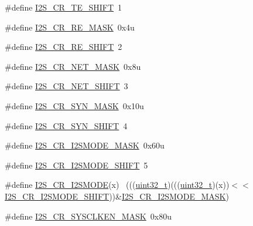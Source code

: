\begin{DoxyCompactItemize}
\item 
\#define \hyperlink{group___i2_s___register___masks_gaa6805ac79a77891ff728129eb07f7685}{I2\+S\+\_\+\+C\+R\+\_\+\+T\+E\+\_\+\+S\+H\+I\+FT}~1
\item 
\#define \hyperlink{group___i2_s___register___masks_ga1fd940f6ddd4eb3aae670de645733e25}{I2\+S\+\_\+\+C\+R\+\_\+\+R\+E\+\_\+\+M\+A\+SK}~0x4u
\item 
\#define \hyperlink{group___i2_s___register___masks_ga2fea363592138a43a8f052f153b8cc5a}{I2\+S\+\_\+\+C\+R\+\_\+\+R\+E\+\_\+\+S\+H\+I\+FT}~2
\item 
\#define \hyperlink{group___i2_s___register___masks_gaf997161eecadb9feb698711bd9ef7d8c}{I2\+S\+\_\+\+C\+R\+\_\+\+N\+E\+T\+\_\+\+M\+A\+SK}~0x8u
\item 
\#define \hyperlink{group___i2_s___register___masks_ga1a66917a059c27bc215cb87ef71bea2f}{I2\+S\+\_\+\+C\+R\+\_\+\+N\+E\+T\+\_\+\+S\+H\+I\+FT}~3
\item 
\#define \hyperlink{group___i2_s___register___masks_ga03f89669e54c6214cafc97d43648298b}{I2\+S\+\_\+\+C\+R\+\_\+\+S\+Y\+N\+\_\+\+M\+A\+SK}~0x10u
\item 
\#define \hyperlink{group___i2_s___register___masks_ga5212bf1a15d3760d888489d7f3de1921}{I2\+S\+\_\+\+C\+R\+\_\+\+S\+Y\+N\+\_\+\+S\+H\+I\+FT}~4
\item 
\#define \hyperlink{group___i2_s___register___masks_gae258d07ec0023513312f8c46c214eda2}{I2\+S\+\_\+\+C\+R\+\_\+\+I2\+S\+M\+O\+D\+E\+\_\+\+M\+A\+SK}~0x60u
\item 
\#define \hyperlink{group___i2_s___register___masks_gac74018b023af91a80fe5fc8200eb3fce}{I2\+S\+\_\+\+C\+R\+\_\+\+I2\+S\+M\+O\+D\+E\+\_\+\+S\+H\+I\+FT}~5
\item 
\#define \hyperlink{group___i2_s___register___masks_ga0dd2afae1691d446d0a1c208bc86006a}{I2\+S\+\_\+\+C\+R\+\_\+\+I2\+S\+M\+O\+DE}(x)                                            ~(((\hyperlink{_p_e___types_8h_a33594304e786b158f3fb30289278f5af}{uint32\+\_\+t})(((\hyperlink{_p_e___types_8h_a33594304e786b158f3fb30289278f5af}{uint32\+\_\+t})(x))$<$$<$\hyperlink{group___i2_s___register___masks_gac74018b023af91a80fe5fc8200eb3fce}{I2\+S\+\_\+\+C\+R\+\_\+\+I2\+S\+M\+O\+D\+E\+\_\+\+S\+H\+I\+FT}))\&\hyperlink{group___i2_s___register___masks_gae258d07ec0023513312f8c46c214eda2}{I2\+S\+\_\+\+C\+R\+\_\+\+I2\+S\+M\+O\+D\+E\+\_\+\+M\+A\+SK})
\item 
\#define \hyperlink{group___i2_s___register___masks_ga5a651cb6323aa200773ae618e24438f9}{I2\+S\+\_\+\+C\+R\+\_\+\+S\+Y\+S\+C\+L\+K\+E\+N\+\_\+\+M\+A\+SK}~0x80u
$$
\end{DoxyCompactItemize}
